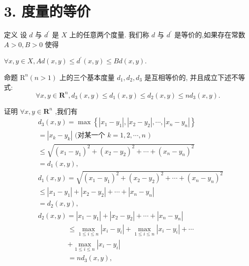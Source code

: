 \section*{3. 度量的等价}

定义 设 $d$ 与 ${d}^{\prime }$ 是 $X$ 上的任意两个度量. 我们称 $d$ 与 ${d}^{\prime }$ 是等价的,如果存在常数 $A > 0,B > 0$ 使得

$\forall x,y \in  X,{Ad}\left( {x,y}\right)  \leq  {d}^{\prime }\left( {x,y}\right)  \leq  {Bd}\left( {x,y}\right) .$

命题 ${\mathrm{R}}^{n}\left( {n > 1}\right)$ 上的三个基本度量 ${d}_{1},{d}_{2},{d}_{3}$ 是互相等价的, 并且成立下述不等式:
$$\forall x,y \in  {\mathbf{R}}^{n},{d}_{3}\left( {x,y}\right)  \leq  {d}_{1}\left( {x,y}\right)  \leq  {d}_{2}\left( {x,y}\right)  \leq  n{d}_{3}\left( {x,y}\right) .$$

证明 $\forall x,y \in  {\mathbf{R}}^{n}$ ,我们有
\begin{align*}
	&{d}_{3}\left( {x,y}\right)  = \max \left\{  {\left| {{x}_{1} - {y}_{1}}\right| ,\left| {{x}_{2} - {y}_{2}}\right| ,\cdots ,\left| {{x}_{n} - {y}_{n}}\right| }\right\}\\
	&= \left| {{x}_{k} - {y}_{k}}\right| \text{ (对某一个 }k = 1,2,\cdots ,n\text{ ) }\\
	&\leq  \sqrt{{\left( {x}_{1} - {y}_{1}\right) }^{2} + {\left( {x}_{2} - {y}_{2}\right) }^{2} + \cdots  + {\left( {x}_{n} - {y}_{n}\right) }^{2}}\\
	&= {d}_{1}\left( {x,y}\right) ,\\
	&{d}_{1}\left( {x,y}\right)  = \sqrt{{\left( {x}_{1} - {y}_{1}\right) }^{2} + {\left( {x}_{2} - {y}_{2}\right) }^{2} + \cdots  + {\left( {x}_{n} - {y}_{n}\right) }^{2}}\\
	&\leq  \left| {{x}_{1} - {y}_{1}}\right|  + \left| {{x}_{2} - {y}_{2}}\right|  + \cdots  + \left| {{x}_{n} - {y}_{n}}\right|\\
	&= {d}_{2}\left( {x,y}\right) ,\\
	&{d}_{2}\left( {x,y}\right)  = \left| {{x}_{1} - {y}_{1}}\right|  + \left| {{x}_{2} - {y}_{2}}\right|  + \cdots  + \left| {{x}_{n} - {y}_{n}}\right|
\end{align*}
\begin{align*}
	&\leq  \mathop{\max }\limits_{{1 \leq  i \leq  n}}\left| {{x}_{i} - {y}_{i}}\right|  + \mathop{\max }\limits_{{1 \leq  i \leq  n}}\left| {{x}_{i} - {y}_{i}}\right|  + \cdots\\
	&+ \mathop{\max }\limits_{{1 \leq  i \leq  n}}\left| {{x}_{i} - {y}_{i}}\right|\\
	&= n{d}_{3}\left( {x,y}\right) ,
\end{align*}

